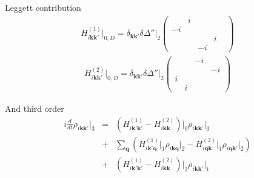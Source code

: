 \documentclass[aps,prb,reprint,noeprint,superscriptaddress]{revtex4-1}
\begin{document}
Leggett contribution
\begin{eqnarray*}
  H_{i\mathbf{kk'}}^{(1)}\big|_{0,D}
  =
  \delta_{\mathbf{kk'}} \delta \Delta''\big|_2
  \begin{pmatrix}
     & i & & \\
    -i &  & & \\
    &&  & i \\
    && -i &  & 
  \end{pmatrix}
\end{eqnarray*}
\begin{eqnarray*}
  H_{i\mathbf{kk'}}^{(2)}\big|_{0,D}
  =
  \delta_{\mathbf{kk'}} \delta \Delta''\big|_2
  \begin{pmatrix}
     && -i & \\
    &  && -i \\
    i &&  & \\
    & i && 
  \end{pmatrix}
\end{eqnarray*}

And third order
\begin{eqnarray*}
i\frac{d}{dt} \rho_{i\mathbf{k}\mathbf{k}'}\big|_3
  &=&
  \left( 
    H_{i\mathbf{k'k'}}^{(1)} - H_{i\mathbf{kk} }^{(2)} 
  \right)\bigg|_0
    \rho_{i\mathbf{kk'}}\big|_3
    \\
	&+&
  \sum_{\mathbf{q}}^{}
  \left( 
    H_{i\mathbf{k'q}}^{(1)}\big|_1 \rho_{i\mathbf{kq }}\big|_2 -
    H_{i\mathbf{qk} }^{(2)}\big|_1 \rho_{i\mathbf{qk'}}\big|_2
  \right)
  \\
	&+&
  \left( 
    H_{i\mathbf{k'k'}}^{(1)} - H_{i\mathbf{kk} }^{(2)} 
  \right)\bigg|_2
    \rho_{i\mathbf{kk'}}\big|_1
\end{eqnarray*}
\end{document}
